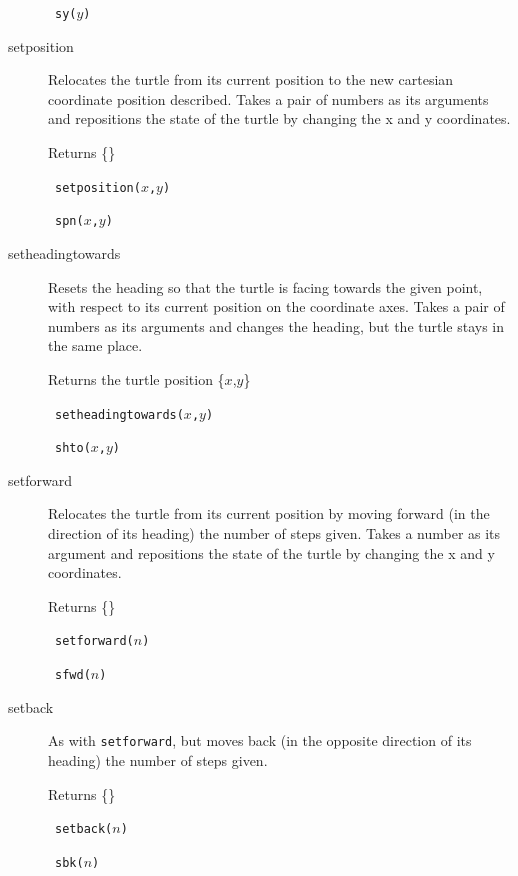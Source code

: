 \begin{description}
       \abb\ {\tt sy($y$)}
 \item[setposition] Relocates the turtle from its current position to the 
       new cartesian coordinate position described. Takes a pair of
       numbers as its arguments and repositions the state of the turtle by 
       changing the x and y coordinates.

       Returns \{\}

       \syntax\ {\tt setposition($x$,$y$)}

       \abb\ {\tt spn($x$,$y$)}
 \item[setheadingtowards] Resets the heading so that the turtle is facing
       towards the given point, with respect to its current position on
       the coordinate axes. Takes a pair of numbers as its arguments and
       changes the heading, but the turtle stays in the same place.

       Returns the turtle position \{$x$,$y$\}

       \syntax\ {\tt setheadingtowards($x$,$y$)}

       \abb\ {\tt shto($x$,$y$)}
 \item[setforward] Relocates the turtle from its current position by
       moving forward (in the direction of its heading) the number of
       steps given. Takes a number as its argument and repositions the
       state of the turtle by changing the x and y coordinates.

       Returns \{\}

       \syntax\ {\tt setforward($n$)}

       \abb\ {\tt sfwd($n$)}
 \item[setback] As with {\tt setforward}, but moves back (in the opposite
       direction of its heading) the number of steps given.

       Returns \{\}

       \syntax\ {\tt setback($n$)}

       \abb\ {\tt sbk($n$)}
\end{description}

